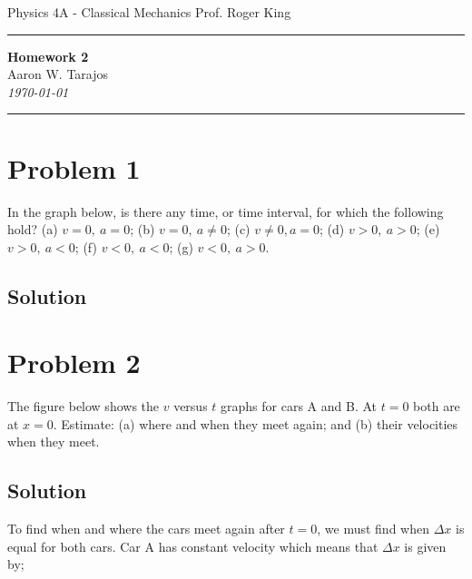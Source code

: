\documentclass{article}
\begin{document}
\noindent
Physics 4A - Classical Mechanics \hfill Prof. Roger King

\noindent\rule{\textwidth}{0.4pt}

\begin{center}
    \textbf{\LARGE Homework 2} \\
    \vspace{12pt}
    \large Aaron W. Tarajos \\
    \textit{\today}
\end{center}

\noindent\rule{\textwidth}{0.4pt}

\section*{Problem 1}
In the graph below, is there any time, or time interval, for which the following hold? (a)
$v = 0,\ a = 0$; (b) $v = 0,\ a \ne 0$; (c) $v \ne 0, a = 0$; (d) $v > 0,\ a > 0$; (e) $v > 0,\ a < 0$;
(f) $v < 0,\ a < 0$; (g) $v < 0,\ a > 0$.

\subsection*{Solution}

\section*{Problem 2}
The figure below shows the $v$ versus $t$ graphs for cars A and B. At $t = 0$ both are at $x = 0$.
Estimate: (a) where and when they meet again; and (b) their velocities when they meet.

\subsection*{Solution}
To find when and where the cars meet again after $t = 0$, we must find when $\Delta x$ is equal for both cars. Car A has constant velocity which means that $\Delta x$ is given by;
\end{document}

